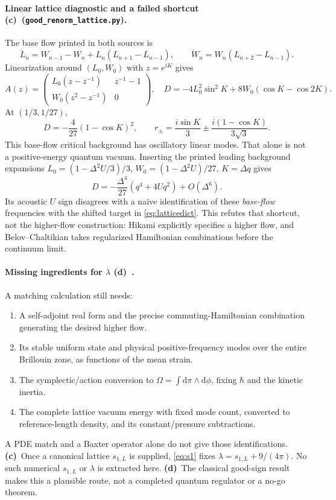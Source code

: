 \documentclass[11pt,a4paper]{article}
\newcommand{\C}{\textbf{(c)}\ }
\newcommand{\D}{\textbf{(d)}\ }
\newcommand{\dd}{\mathrm d}
\newcommand{\file}[1]{\nolinkurl{#1}}
\newcommand{\lat}{\file{good_renorm_lattice.py}}
\begin{document}
\paragraph{Linear lattice diagnostic and a failed shortcut \C (\lat).}
The base flow printed in both sources is
\begin{equation}
 \dot L_n=W_{n-1}-W_n+L_n(L_{n+1}-L_{n-1}),\qquad
 \dot W_n=W_n(L_{n+2}-L_{n-1}).
\end{equation}
Linearization around $(L_0,W_0)$ with $z=e^{iK}$ gives
\begin{equation}
 A(z)=\begin{pmatrix}L_0(z-z^{-1})&z^{-1}-1\\
 W_0(z^2-z^{-1})&0\end{pmatrix},\quad
 D=-4L_0^2\sin^2K+8W_0(\cos K-\cos2K).
\end{equation}
At $(1/3,1/27)$,
\begin{equation}
 D=-\frac4{27}(1-\cos K)^2,\qquad
 r_\pm=\frac{i\sin K}{3}\pm\frac{i(1-\cos K)}{3\sqrt3}.
\end{equation}
This base-flow critical background has oscillatory linear modes. That
alone is not a positive-energy quantum vacuum. Inserting the printed
leading background expansions $L_0=(1-\Delta^2U/3)/3$,
$W_0=(1-\Delta^2U)/27$, $K=\Delta q$ gives
\begin{equation}
 D=-\frac{\Delta^4}{27}(q^4+4Uq^2)+O(\Delta^6).
\end{equation}
Its acoustic $U$ sign disagrees with a naive identification of these
\emph{base-flow} frequencies with the shifted target in
\eqref{eq:latticedict}. This refutes that shortcut, not the higher-flow
construction: Hikami explicitly specifies a higher flow, and
Belov--Chaltikian takes regularized Hamiltonian combinations before the
continuum limit.

\paragraph{Missing ingredients for $\lambda$ \D.}
A matching calculation still needs:
\begin{enumerate}
\item A self-adjoint real form and the precise commuting-Hamiltonian
combination generating the desired higher flow.
\item Its stable uniform state and physical positive-frequency modes over
the entire Brillouin zone, as functions of the mean strain.
\item The symplectic/action conversion to
$\Omega=\int\dd\pi\wedge\dd\phi$, fixing $\hbar$ and the kinetic inertia.
\item The complete lattice vacuum energy with fixed mode count, converted
to reference-length density, and its constant/pressure subtractions.
\end{enumerate}
A PDE match and a Baxter operator alone do not give those identifications.
\C Once a canonical lattice $s_{1,L}$ is supplied, \eqref{eq:s1} fixes
$\lambda=s_{1,L}+9/(4\pi)$. No such numerical $s_{1,L}$ or $\lambda$ is
extracted here. \D The classical good-sign result makes this a plausible
route, not a completed quantum regulator or a no-go theorem.
\end{document}
